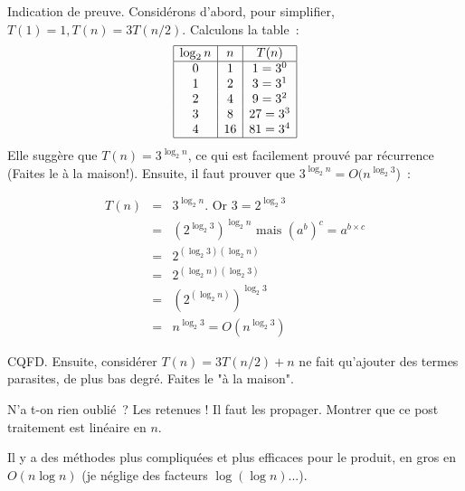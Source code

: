 \documentclass[a4paper]{article}
\begin{document}
Indication de preuve. Consid\'erons d'abord, pour simplifier, $T(1)=1, T(n)=3 T(n/2)$.
Calculons la table~:
$$ \begin{array}{|c|c|c|}
\hline
\log_2 n & n  & T(n) \\
\hline
0 & 1 & 1= 3^0 \\
1 & 2 & 3= 3^1 \\
2 & 4 & 9= 3^2 \\
3 & 8 & 27= 3^3 \\
4 & 16 & 81= 3^4 \\
\hline
\end{array}$$
Elle sugg\`ere que $T(n)=3 ^{\log_2 n}$, ce qui est facilement prouv\'e par r\'ecurrence 
(Faites le \`a la maison!).
Ensuite, il faut prouver que $3 ^{\log_2 n}=O(n^{\log_2 3}$)~:

{
\begin{eqnarray*}
T(n) &=& 3^{\log_2 n}  \mbox{. Or } 3=2 ^{\log_2 3} \\
&=& (2^{\log_2 3})^{\log_2 n} \mbox{ mais } (a^b)^c=a^{b\times c} \\
&=& 2^{(\log_2 3) (\log_2 n)} \\
&=& 2^{(\log_2 n) (\log_2 3)} \\
&=& (2^{(\log_2 n)})^{\log_2 3} \\
&=& n^{\log_2 3} = O(n^{\log_2 3})
\end{eqnarray*}

}

CQFD. Ensuite, consid\'erer $T(n)=3T(n/2)+n$ ne fait qu'ajouter des termes 
parasites, de plus bas degr\'e. Faites le "\`a la maison".


N'a t-on rien oubli\'e~? Les retenues ! Il faut les propager. Montrer que ce post traitement est lin\'eaire en $n$.

Il y a des m\'ethodes plus compliqu\'ees et plus efficaces pour le produit, en gros en $O(n \log n)$
(je n\'eglige des facteurs $\log (\log n)$...).
\end{document}
